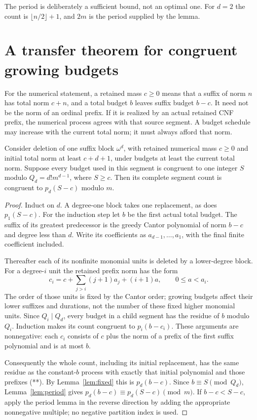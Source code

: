 \documentclass[11pt]{article}
\begin{document}
The period is deliberately a sufficient bound, not an optimal one.
For $d=2$ the count is $\lfloor n/2\rfloor+1$, and $2m$
is the period supplied by the lemma.

\section{A transfer theorem for congruent growing budgets}

For the numerical statement, a retained mass $c\ge0$ means that a
suffix of norm $n$ has total norm $c+n$, and a total budget $b$ leaves
suffix budget $b-c$. It need not be the norm of an ordinal prefix.
If it is realized by an actual retained CNF prefix, the numerical
process agrees with that source segment. A budget schedule may increase
with the current total norm; it must always afford that norm.

\begin{theorem}\label{thm:transfer}
Consider deletion of one suffix block $\omega^d$, with retained
numerical mass $c\ge0$ and initial total norm at least $c+d+1$,
under budgets at least the current total norm. Suppose
every budget used in this segment is congruent to one integer $S$
modulo $Q_d=d!m^{d-1}$, where $S\ge c$. Then its complete segment
count is congruent to $p_d(S-c)$ modulo $m$.
\end{theorem}
\begin{proof}
Induct on $d$. A degree-one block takes one replacement, as does
$p_1(S-c)$. For the induction step let $b$ be the first actual
total budget. The suffix of its greatest predecessor is the greedy
Cantor polynomial of norm $b-c$ and degree less than $d$.
Write its coefficients as $a_{d-1},\ldots,a_1$, with the final
finite coefficient included.

Thereafter each of its nonfinite monomial units is deleted by a
lower-degree block. For a degree-$i$ unit the retained prefix norm
has the form
\[
 c_i=c+\sum_{j>i}(j+1)a_j+(i+1)a,\qquad 0\le a<a_i.
 \tag{**}
\]
The order of those units is fixed by the Cantor order; growing
budgets affect their lower suffixes and durations, not the number
of these fixed higher monomial units. Since $Q_i\mid Q_d$, every
budget in a child segment has the residue of $b$ modulo $Q_i$.
Induction makes its count congruent to $p_i(b-c_i)$.
These arguments are nonnegative: each $c_i$ consists of $c$ plus
the norm of a prefix of the first suffix polynomial and is at most $b$.

Consequently the whole count, including its initial replacement,
has the same residue as the constant-$b$ process with exactly that
initial polynomial and those prefixes (**). By
Lemma~\ref{lem:fixed} this is $p_d(b-c)$.
Since $b\equiv S\pmod {Q_d}$, Lemma~\ref{lem:period} gives
$p_d(b-c)\equiv p_d(S-c)\pmod m$. If $b-c<S-c$,
apply the period lemma in the reverse direction by adding the
appropriate nonnegative multiple; no negative partition index is used.
\end{proof}
\end{document}
